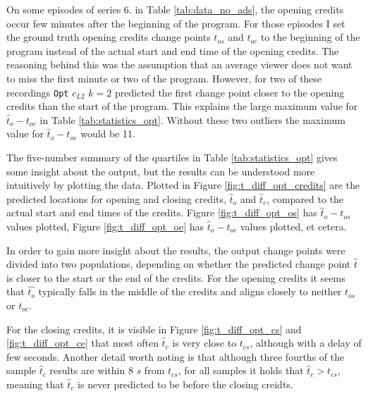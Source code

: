 On some episodes of series 6. in Table \ref{tab:data_no_ads}, the opening credits occur few minutes after the beginning of the program. For those episodes I set the ground truth opening credits change points $t_{os}$ and $t_{oc}$ to the beginning of the program instead of the actual start and end time of the opening credits. The reasoning behind this was the assumption that an average viewer does not want to miss the first minute or two of the program. However, for two of these recordings \texttt{Opt} $c_{L2}$ $k=2$ predicted the first change point closer to the opening credits than the start of the program. This explains the large maximum value for $\hat{t}_o-t_{oe}$ in Table \ref{tab:statistics_opt}. Without these two outliers the maximum value for $\hat{t}_o-t_{oe}$ would be 11.

The five-number summary of the quartiles in Table \ref{tab:statistics_opt} gives some insight about the output, but the results can be understood more intuitively by plotting the data.
Plotted in Figure \ref{fig:t_diff_opt_credits} are the predicted locations for opening and closing credits, $\hat{t}_o$ and $\hat{t}_c$, compared to the actual start and end times of the credits. Figure \ref{fig:t_diff_opt_os} has $\hat{t}_o-t_{os}$ values plotted, Figure \ref{fig:t_diff_opt_oe} has $\hat{t}_o-t_{oc}$ values plotted, et cetera.

In order to gain more insight about the %
results, the output change points were divided into two populations, depending on whether the predicted change point $\hat{t}$ is closer to the start or the end of the credits. %
For the opening credits it seems that $\hat{t_o}$ typically falls in the middle of the credits  and aligns closely to neither $t_{os}$ or $t_{oc}$. %

For the closing credits, it is visible in Figure \ref{fig:t_diff_opt_cs} and \ref{fig:t_diff_opt_ce} that most often $\hat{t}_c$ is very close to $t_{cs}$, although with a delay of few seconds. %
Another detail worth noting is that although three fourths of the sample $\hat{t}_c$ results are within $8$ $s$ from $t_{cs}$, for all samples it holds that $ \hat{t}_c > t_{cs}$, meaning that $\hat{t}_c$ is never predicted to be before the closing creidts.

